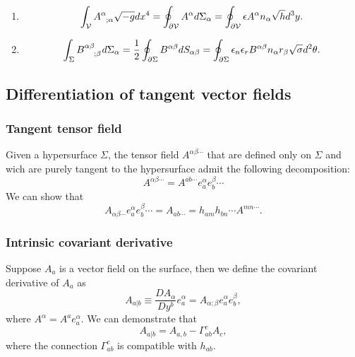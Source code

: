\begin{newthem}
\begin{enumerate} 
\item \[\int_{\mathcal{V}} \tensor{A}{^{\alpha}_{;\alpha}} \sqrt{-g} dx^4 = \oint_{\partial \mathcal{V}} A^{\alpha} d\Sigma_{\alpha} = \oint_{\partial \mathcal{V}} \epsilon A^{\alpha} n_{\alpha} \sqrt{h} d^3y.\]
\item \[\int_{\Sigma} \tensor{B}{^{\alpha \beta}_{;\beta}} d\Sigma_{\alpha} = \frac{1}{2}\oint_{\partial \Sigma} B^{\alpha \beta} dS_{\alpha \beta} = \oint_{\partial \Sigma} \epsilon_n \epsilon_r B^{\alpha \beta} n_{\alpha} r_{\beta} \sqrt{\sigma} d^2\theta.\]
\end{enumerate}
\end{newthem}

\subsection{Differentiation of tangent vector fields}
\subsubsection{Tangent tensor field}
Given a hypersurface $\Sigma$, the tensor field $A^{\alpha\beta\cdots}$ that are defined only on $\Sigma$ and wich are purely tangent to the hypersurface admit the following decomposition:
\[A^{\alpha \beta \cdots} = A^{ab\cdots} e_a^{\alpha} e_b^{\beta} \cdots\]
We can show that
\[A_{\alpha \beta \cdots} e_a^{\alpha} e_b^{\beta} \cdots = A_{ab\cdots} = h_{am} h_{bn} \cdots A^{mn\cdots}.\]

\subsubsection{Intrinsic covariant derivative}
Suppose $A_{a}$ is a vector field on the surface, then we define the covariant derivative of $A_{a}$ as
\[A_{a|b} \equiv  \frac{D A_{\alpha}}{D y^b} e_a^{\alpha} = A_{\alpha;\beta}e_a^{\alpha} e_b^{\beta},\]
where $A^{\alpha} = A^a e_a^{\alpha}$.
We can demonstrate that
\[A_{a|b} = A_{a,b} - \Gamma^c_{ab}A_c,\]
where the connection $\Gamma^c_{ab}$ is compatible with $h_{ab}$.

